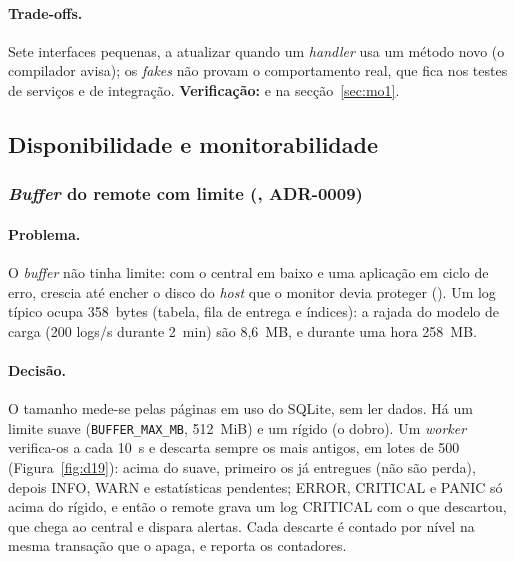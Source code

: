 \paragraph{Trade-offs.}
Sete interfaces pequenas, a atualizar quando um \emph{handler} usa um método novo (o compilador avisa); os
\emph{fakes} não provam o comportamento real, que fica nos testes de serviços e de integração.
\textbf{Verificação:}  e  na secção~\ref{sec:mo1}.

\subsection{Disponibilidade e monitorabilidade}

\subsubsection{\emph{Buffer} do remote com limite (, ADR-0009)}
\label{sec:d19}

\paragraph{Problema.}
O \emph{buffer} não tinha limite: com o central em baixo e uma aplicação em ciclo de erro, crescia até encher o
disco do \emph{host} que o monitor devia proteger (). Um log típico ocupa 358~bytes (tabela, fila de
entrega e índices): a rajada do modelo de carga (200 logs/s durante 2~min) são 8,6~MB, e durante uma hora 258~MB.

\paragraph{Decisão.}
O tamanho mede-se pelas páginas em uso do SQLite, sem ler dados. Há um limite suave (\texttt{BUFFER\_MAX\_MB},
512~MiB) e um rígido (o dobro). Um \emph{worker} verifica-os a cada 10~s e descarta sempre os mais antigos, em lotes
de 500 (Figura~\ref{fig:d19}): acima do suave, primeiro os já entregues (não são perda), depois INFO, WARN e
estatísticas pendentes; ERROR, CRITICAL e PANIC só acima do rígido, e então o remote grava um log CRITICAL com o que
descartou, que chega ao central e dispara alertas. Cada descarte é contado por nível na mesma transação que o apaga,
e  reporta os contadores.

